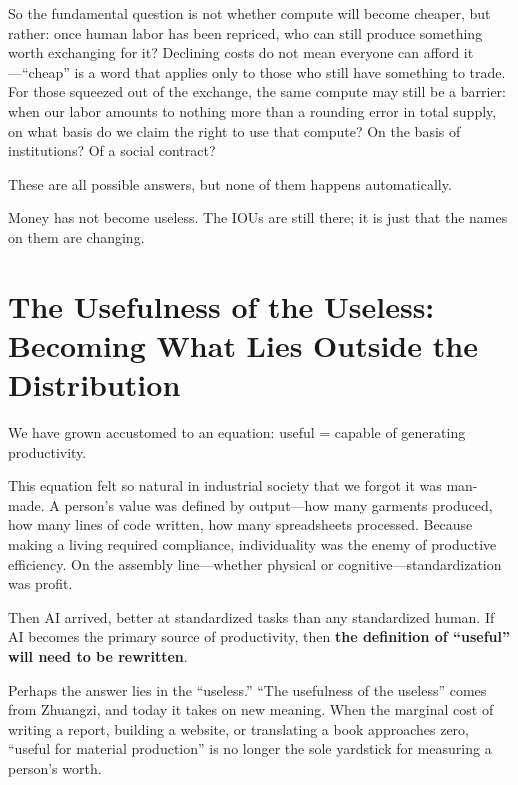 \vspace{1em}

So the fundamental question is not whether compute will become cheaper, but rather: once human labor has been repriced, who can still produce something worth exchanging for it?
Declining costs do not mean everyone can afford it---``cheap'' is a word that applies only to those who still have something to trade. For those squeezed out of the exchange, the same compute may still be a barrier: when our labor amounts to nothing more than a rounding error in total supply, on what basis do we claim the right to use that compute? On the basis of institutions? Of a social contract?

\vspace{1em}

These are all possible answers, but none of them happens automatically.

Money has not become useless. The IOUs are still there; it is just that the names on them are changing.

\newpage
\section{The Usefulness of the Useless: Becoming What Lies Outside the Distribution}

We have grown accustomed to an equation: useful = capable of generating productivity.

This equation felt so natural in industrial society that we forgot it was man-made. A person's value was defined by output---how many garments produced, how many lines of code written, how many spreadsheets processed. Because making a living required compliance, individuality was the enemy of productive efficiency. On the assembly line---whether physical or cognitive---standardization was profit.

\vspace{1em}

Then AI arrived, better at standardized tasks than any standardized human.
If AI becomes the primary source of productivity, then \textbf{the definition of ``useful'' will need to be rewritten}.

Perhaps the answer lies in the ``useless.'' ``The usefulness of the useless'' comes from Zhuangzi, and today it takes on new meaning. When the marginal cost of writing a report, building a website, or translating a book approaches zero, ``useful for material production'' is no longer the sole yardstick for measuring a person's worth.

